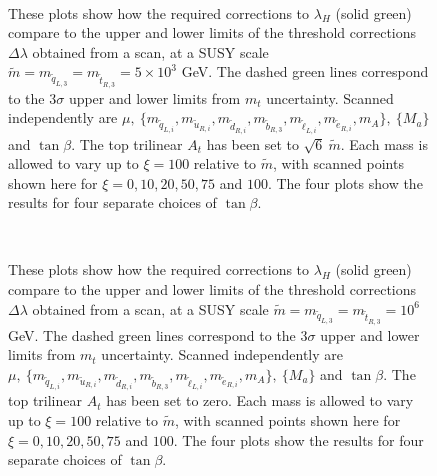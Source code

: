 \documentclass[12pt]{article}
\newcommand{\sq}{\tilde{q}}
\newcommand{\mStL}{m_{\sq_{L,3}}}
\newcommand{\mSqL}{m_{\sq_{L,i}}}
\newcommand{\mStR}{m_{\tilde{t}_{R,3}}}
\newcommand{\mSbR}{m_{\tilde{b}_{R,3}}}
\newcommand{\mSuR}{m_{\tilde{u}_{R,i}}}
\newcommand{\mSdR}{m_{\tilde{d}_{R,i}}}
\newcommand{\mSeR}{m_{\tilde{e}_{R,i}}}
\newcommand{\mSlL}{m_{\tilde{\ell}_{L,i}}}
\newcommand{\mS}{\tilde{m}}
\begin{document}
\begin{figure}[H]
\centering
{}
\\
\caption{
These plots show how the required corrections to $\lambda_H$ (solid green) compare to the upper and lower limits of the threshold corrections $\Delta\lambda$ obtained from a scan, at a SUSY scale $\mS = \mStL=\mStR = 5\times10^3$ GeV. 
The dashed green lines correspond to the $3\sigma$ upper and lower limits from $m_t$ uncertainty. 
Scanned independently are $ \mu,~ \{ \mSqL, \mSuR, \mSdR, \mSbR, \mSlL, \mSeR, m_A \},~ \{ M_a\}$ and $\tan\beta$. The top trilinear $A_t$ has been set to $\sqrt{6}\ \mS$. Each mass is allowed to vary up to $\xi=100$ relative to $\mS$, with scanned points shown here for $\xi=0,10,20,50,75$ and $100$. The four plots show the results for four separate choices of $\tan \beta$.
}
\label{TeVVary.FIG}
\end{figure}

\begin{figure}[H]
\centering
{}
\\
\caption{
These plots show how the required corrections to $\lambda_H$ (solid green) compare to the upper and lower limits of the threshold corrections $\Delta\lambda$ obtained from a scan, at a SUSY scale $\mS = \mStL=\mStR = 10^6$ GeV. 
The dashed green lines correspond to the $3\sigma$ upper and lower limits from $m_t$ uncertainty.
Scanned independently are $ \mu,~ \{ \mSqL, \mSuR, \mSdR, \mSbR, \mSlL, \mSeR, m_A \},~ \{ M_a\}$ and $\tan\beta$. The top trilinear $A_t$ has been set to zero. Each mass is allowed to vary up to $\xi=100$ relative to $\mS$, with scanned points shown here for $\xi=0,10,20,50,75$ and $100$. The four plots show the results for four separate choices of $\tan \beta$.
}
\label{PeVVary.FIG}
\end{figure}
\end{document}

